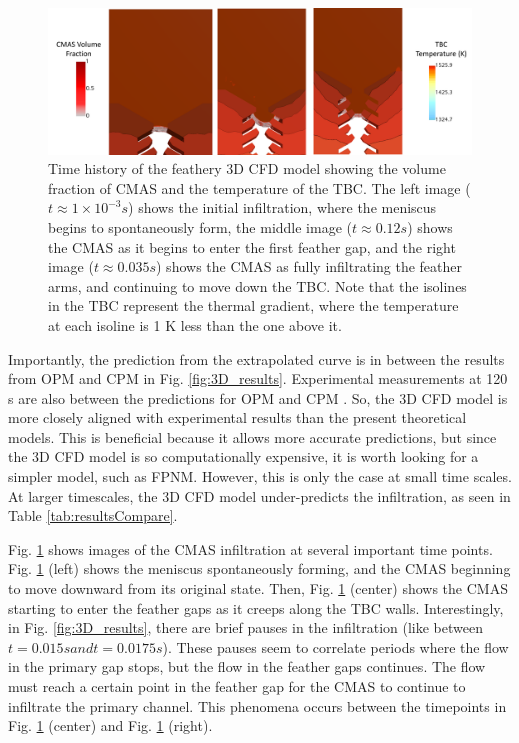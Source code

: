 \documentclass[%
 aip,
 amsmath,amssymb,
 reprint,%
floatfix]{revtex4-1}
\begin{document}
\begin{figure}
    \centering
    \includegraphics[width=\linewidth]{Figures/3D_timehistory.png}
    \caption{Time history of the feathery 3D CFD model showing the volume fraction of CMAS and the temperature of the TBC. The left image ($t \approx 1\times 10^{-3}s$) shows the initial infiltration, where the meniscus begins to spontaneously form, the middle image ($t \approx 0.12 s$) shows the CMAS as it begins to enter the first feather gap, and the right image ($t \approx 0.035 s$) shows the CMAS as fully infiltrating the feather arms, and continuing to move down the TBC. Note that the isolines in the TBC represent the thermal gradient, where the temperature at each isoline is 1 K less than the one above it.}
    \label{fig:3D_timehistory}
\end{figure}

Importantly, the prediction from the extrapolated curve is in between the results from OPM and CPM in Fig. \ref{fig:3D_results}. Experimental measurements at 120 s are also between the predictions for OPM and CPM \cite{Naraparaju2017}. So, the 3D CFD model is more closely aligned with experimental results than the present theoretical models. This is beneficial because it allows more accurate predictions, but since the 3D CFD model is so computationally expensive, it is worth looking for a simpler model, such as FPNM. However, this is only the case at small time scales. At larger timescales, the 3D CFD model under-predicts the infiltration, as seen in Table \ref{tab:resultsCompare}. 

Fig. \ref{fig:3D_timehistory} shows images of the CMAS infiltration at several important time points. Fig. \ref{fig:3D_timehistory} (left) shows the meniscus spontaneously forming, and the CMAS beginning to move downward from its original state. Then, Fig. \ref{fig:3D_timehistory} (center) shows the CMAS starting to enter the feather gaps as it creeps along the TBC walls. Interestingly, in Fig. \ref{fig:3D_results}, there are brief pauses in the infiltration (like between $t=0.015 s and t=0.0175 s$). These pauses seem to correlate periods where the flow in the primary gap stops, but the flow in the feather gaps continues. The flow must reach a certain point in the feather gap for the CMAS to continue to infiltrate the primary channel. This phenomena occurs between the timepoints in Fig. \ref{fig:3D_timehistory} (center) and Fig. \ref{fig:3D_timehistory} (right).
\end{document}
